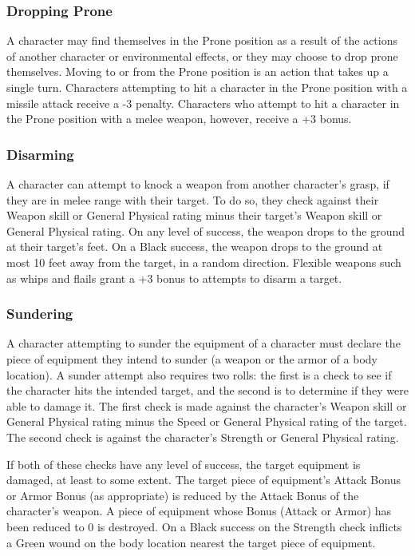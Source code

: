 \documentclass[oneside]{book}
\begin{document}
\begin{multicols}{2}
\subsubsection{Dropping Prone}
A character may find themselves in the Prone position as a result of the actions of another character or environmental effects, or they may choose to drop prone themselves. Moving to or from the Prone position is an action that takes up a single turn. Characters attempting to hit a character in the Prone position with a missile attack receive a -3 penalty. Characters who attempt to hit a character in the Prone position with a melee weapon, however, receive a +3 bonus. 

\subsubsection{Disarming}
A character can attempt to knock a weapon from another character's grasp, if they are in melee range with their target. To do so, they check against their Weapon skill or General Physical rating minus their target's Weapon skill or General Physical rating. On any level of success, the weapon drops to the ground at their target's feet. On a Black success, the weapon drops to the ground at most 10 feet away from the target, in a random direction. Flexible weapons such as whips and flails grant a +3 bonus to attempts to disarm a target.

\subsubsection{Sundering}
A character attempting to sunder the equipment of a character must declare the piece of equipment they intend to sunder (a weapon or the armor of a body location). A sunder attempt also requires two rolls: the first is a check to see if the character hits the intended target, and the second is to determine if they were able to damage it. The first check is made against the character's Weapon skill or General Physical rating minus the Speed or General Physical rating of the target. The second check is against the character's Strength or General Physical rating. 

If both of these checks have any level of success, the target equipment is damaged, at least to some extent. The target piece of equipment's Attack Bonus or Armor Bonus (as appropriate) is reduced by the Attack Bonus of the character's weapon. A piece of equipment whose Bonus (Attack or Armor) has been reduced to 0 is destroyed. On a Black success on the Strength check inflicts a Green wound on the body location nearest the target piece of equipment.  


\end{multicols}
\end{document}

